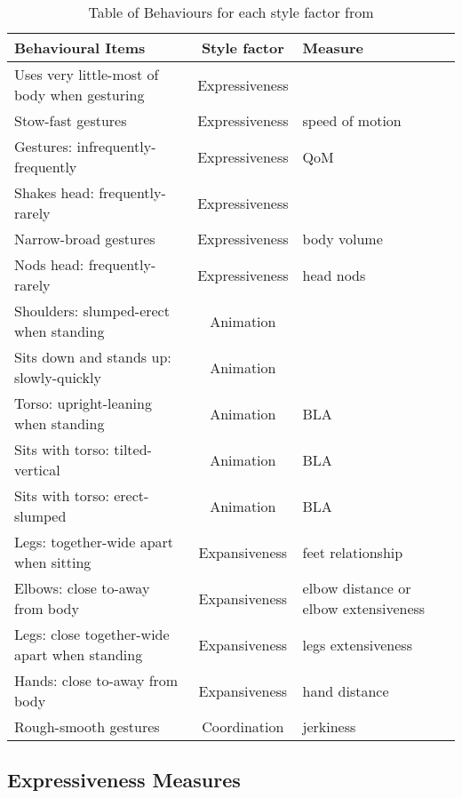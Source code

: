 \begin{table}[h]
	\small
	\centering
	\begin{tabular}{|l |c| l }\hline
		\textbf{Behavioural Items}  &	\textbf{Style factor} & Measure \\ \hline
		Uses very little-most of body when gesturing & Expressiveness  & \\
		Stow-fast gestures  & Expressiveness  & speed of motion\\
		Gestures: infrequently-frequently & Expressiveness & QoM\\
		Shakes head: frequently-rarely & Expressiveness & \\
		Narrow-broad gestures & Expressiveness & body volume\\
		Nods head: frequently-rarely & Expressiveness & head nods\\ \hline
	
		Shoulders: slumped-erect when standing & Animation &\\
		Sits down and stands up: slowly-quickly & Animation &\\
		Torso: upright-leaning when standing & Animation & BLA\\
		Sits with torso: tilted-vertical & Animation & BLA\\
		Sits with torso: erect-slumped & Animation & BLA\\ \hline
	
		Legs: together-wide apart when sitting & Expansiveness & feet relationship\\
		Elbows: close to-away from body & Expansiveness & elbow distance or elbow extensiveness\\
		Legs: close together-wide apart when standing  & Expansiveness & legs extensiveness\\
		Hands: close to-away from body & Expansiveness & hand distance\\ 
 \hline
		
	

		Rough-smooth gestures & Coordination& jerkiness\\ 
	
		\hline
	
	\end{tabular}
	\label{tab:styledims_gallaher}
	\caption{Table of Behaviours for each style factor from \cite{Gallaher1992}}
	
\end{table} 


\subsection{Expressiveness Measures}
